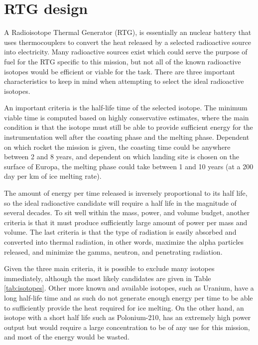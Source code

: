 \section{RTG design}

A Radioisotope Thermal Generator (RTG), is essentially an nuclear battery that uses thermocouplers to convert the heat released by a selected radioactive source into electricity. Many radioactive sources exist which could serve the purpose of fuel for the RTG specific to this mission, but not all of the known radioactive isotopes would be efficient or viable for the task. There are three important characteristics to keep in mind when attempting to select the ideal radioactive isotopes.

An important criteria is the half-life time of the selected isotope. The minimum viable time is computed based on highly conservative estimates, where the main condition is that the isotope must still be able to provide sufficient energy for the instrumentation well after the coasting phase and the melting phase. Dependent on which rocket the mission is given, the coasting time could be anywhere between 2 and 8 years, and dependent on which landing site is chosen on the surface of Europa, the melting phase could take between 1 and 10 years (at a 200 day per km of ice melting rate). 

The amount of energy per time released is inversely proportional to its half life, so the ideal radioactive candidate will require a half life in the magnitude of several decades. To sit well within the mass, power, and volume budget, another criteria is that it must produce sufficiently large amount of power per mass and volume. The last criteria is that the type of radiation is easily absorbed and converted into thermal radiation, in other words, maximize the alpha particles released, and minimize the gamma, neutron, and penetrating radiation.

Given the three main criteria, it is possible to exclude many isotopes immediately, although the most likely candidates are given in Table \ref{tab:isotopes}. Other more known and available isotopes, such as Uranium, have a long half-life time and as such do not generate enough energy per time to be able to sufficiently provide the heat required for ice melting. On the other hand, an isotope with a short half life such as Polonium-210, has an extremely high power output but would require a large concentration to be of any use for this mission, and most of the energy would be wasted.

